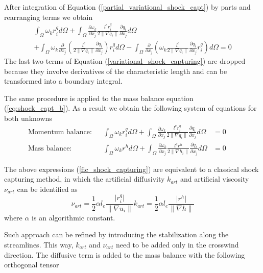 \documentclass[a4paper,12pt]{elsarticle}
\newcommand{\pder}[2]{\frac{\partial#1}{\partial#2}}
\newcommand{\abs}[1]{\lvert#1\rvert}
\newcommand{\norm}[1]{\lVert#1\rVert}
\begin{document}
After integration of Equation (\ref{partial_variational_shock_capt}) by parts and rearranging terms we obtain
\begin{multline}
    \int_\Omega \omega_k r_i^q d\Omega 
    + \int_\Omega \pder{\omega_k}{x_j}
        \frac{l^e r_i^q}{2\norm{\nabla q_i}}\pder{q_i}{x_j} d\Omega \\
    + \int_\Omega \omega_k \pder{}{x_j}\left(
         \frac{l^e}{2\norm{\nabla q_i}}\pder{q_i}{x_j}
        \right)r_i^q d\Omega 
    - \int_\Omega \pder{}{x_j}\left(
        \omega_k \frac{l^e}{2\norm{\nabla q_i}}\pder{q_i}{x_j}r_i^q \right) d\Omega
        = 0
        \label{variational_shock_capturing}
\end{multline}
The last two terms of Equation (\ref{variational_shock_capturing}) are dropped because they involve derivatives of the characteristic length and can be transformed into a boundary integral.

The same procedure is applied to the mass balance equation (\ref{eq:shock_capt_b}). As a result we obtain the following system of equations for both unknowns
\begin{subequations} \label{fic_shock_capturing}
\begin{align}
\text{Momentum balance:} &&
\int_\Omega \omega_k r_i^q d\Omega 
+ \int_\Omega \pder{\omega_k}{x_j}
\frac{l^e r_i^q}{2\norm{\nabla q_i}}\pder{q_i}{x_j} d\Omega &=0 && \\
\text{Mass balance:} &&
\int_\Omega \omega_k r^h d\Omega 
+ \int_\Omega \pder{\omega_k}{x_j}
    \frac{l^e r^h}{2\norm{\nabla h_i}}\pder{q_i}{x_j} d\Omega &=0
\end{align}
\end{subequations}

The above expressions (\ref{fic_shock_capturing}) are equivalent to a classical shock capturing method, in which the artificial diffusivity $k_{art}$ and artificial viscosity $\nu_{art}$ can be identified as
\begin{subequations} \label{k_art}
\begin{equation}
\nu_{art} = \frac{1}{2}\alpha l_e \frac{\abs{r_i^q}}{\norm{\nabla u_i}}
\end{equation}
\begin{equation}
k_{art} = \frac{1}{2}\alpha l_e \frac{\abs{r^h}}{\norm{\nabla h}}
\end{equation}
\end{subequations}
where $\alpha$ is an algorithmic constant.

Such approach can be refined by introducing the stabilization along the streamlines. This way, $k_{art}$ and $\nu_{art}$ need to be added only in the crosswind direction. The diffusive term is added to the mass balance with the following orthogonal tensor
\end{document}
